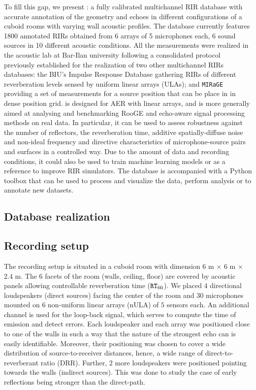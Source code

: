 To fill this gap, we present \dEchorate{}: a fully calibrated multichannel RIR database with accurate annotation of the geometry and echoes in different configurations of a cuboid rooms with varying wall acoustic profiles.
The database currently features 1800 annotated RIRs obtained from 6 arrays of 5 microphones each, 6 sound sources in 10 different acoustic conditions. All the measurements were realized in the acoustic lab at Bar-Ilan university following a consolidated protocol previously established for the realization of two other multichannel RIRs databases: the BIU's Impulse Response Database  gathering RIRs of different reverberation levels sensed by uniform linear arrays (ULAs); and \texttt{MIRaGE}  providing a set of measurements for a source position that can be place in in dense position grid. \dEchorate{} is designed for AER with linear arrays, and is more generally aimed at analysing and benchmarking RooGE and echo-aware signal processing methods on real data. In particular, it can be used to assess robustness against the number of reflectors, the reverberation time, additive spatially-diffuse noise and non-ideal frequency and directive characteristics of microphone-source pairs and surfaces in a controlled way. Due to the amount of data and recording conditions, it could also be used to train machine learning models or as a reference to improve RIR simulators.
The database is accompanied with a Python toolbox that can be used to process and visualize the data,  perform analysis or to annotate new datasets.



\subsection{Database realization}
\subsection{Recording setup}
The recording setup is situated in a cuboid room with dimension 6 m $\times$ 6 m $\times$ 2.4 m. The 6 facets of the room (walls, ceiling, floor) are covered by acoustic panels allowing controllable reverberation time ($\mathtt{RT}_{60}$). We placed $4$ directional loudspeakers (direct sources) facing the center of the room and $30$ microphones mounted on $6$ non-uniform linear arrays (nULA) of $5$ sensors each. An additional channel is used for the loop-back signal, which serves to compute the time of emission and detect errors. Each loudspeaker and each array was positioned close to one of the walls in such a way that the nature of the strongest echo can is easily identifiable. Moreover, their positioning was chosen to cover a wide distribution of source-to-receiver distances, hence, a wide range of direct-to-reverberant ratio (DRR). Further, $2$ more loudspeakers were positioned pointing towards the walls (indirect sources). This was done to study the case of early reflections being stronger than the direct-path.

